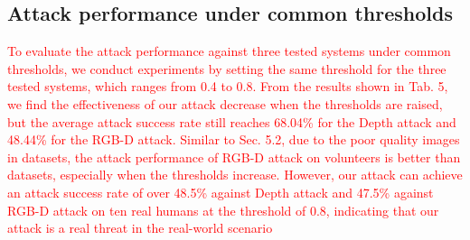 \subsection{Attack performance under common thresholds}
\label{sec:common_thresholds}
\textcolor{red}{
To evaluate the attack performance against three tested systems under common thresholds, we conduct experiments by setting the same threshold for the three tested systems, which ranges from 0.4 to 0.8. From the results shown in Tab. 5, we find the effectiveness of our attack decrease when the thresholds are raised, but the average attack success rate still reaches 68.04\% for the Depth attack and 48.44\% for the RGB-D attack. Similar to Sec. 5.2, due to the poor quality images in datasets, the attack performance of RGB-D attack on volunteers is better than datasets, especially when the thresholds increase. However, our attack can achieve an attack success rate of over 48.5\% against Depth attack and 47.5\% against RGB-D attack on ten real humans at the threshold of 0.8, indicating that our attack is a real threat in the real-world scenario
}

